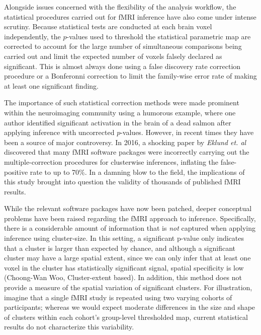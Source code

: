 Alongside issues concerned with the flexibility of the analysis workflow, the statistical procedures carried out for fMRI inference have also come under intense scrutiny. Because statistical tests are conducted at each brain voxel independently, the $p$-values used to threshold the statistical parametric map are corrected to account for the large number of simultaneous comparisons being carried out and limit the expected number of voxels falsely declared as significant. This is almost always done using a false discovery rate correction procedure or a Bonferonni correction to limit the family-wise error rate of making at least one significant finding. 

The importance of such statistical correction methods were made prominent within the neuroimaging community using a humorous example, where one author identified significant activation in the brain of a dead salmon after applying inference with uncorrected $p$-values. However, in recent times they have been a source of major controversy. In 2016, a shocking paper by \textit{Eklund et. al} discovered that many fMRI software packages were incorrectly carrying out the multiple-correction procedures for clusterwise inferences, inflating the false-positive rate to up to 70\%. In a damning blow to the field, the implications of this study brought into question the validity of thousands of published fMRI results. 

While the relevant software packages have now been patched, deeper conceptual problems have been raised regarding the fMRI approach to inference. Specifically, there is a considerable amount of information that is \textit{not} captured when applying inference using cluster-size. In this setting, a significant p-value only indicates that a cluster is larger than expected by chance, and although a significant cluster may have a large spatial extent, since we can only infer that at least one voxel in the cluster has statistically significant signal, spatial specificity is low (Choong-Wan Woo, Cluster-extent based). In addition, this method does not provide a measure of the spatial variation of significant clusters. For illustration, imagine that a single fMRI study is repeated using two varying cohorts of participants; whereas we would expect moderate differences in the size and shape of clusters within each cohort's group-level thresholded map, current statistical results do not characterize this variability. 

